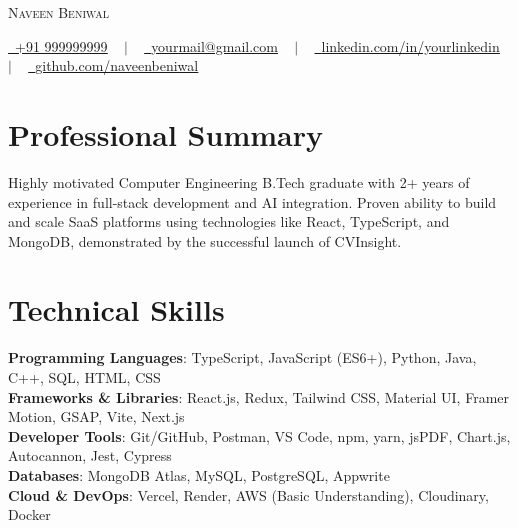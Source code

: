 \documentclass[letterpaper,11pt]{article}
\begin{document}
\begin{center}
    {\Huge \scshape Naveen Beniwal} \\ \vspace{8pt}
    
    \small 
    \href{tel:+919999999999}{\raisebox{-0.1\height}\faPhone\ \underline{+91 999999999}} ~ $|$ ~
    \href{mailto:youremail@gmail.com}{\raisebox{-0.2\height}\faEnvelope\ \underline{yourmail@gmail.com}} ~ $|$ ~
    \href{https://linkedin.com/in/naveenbeniwal}{\raisebox{-0.2\height}\faLinkedin\ \underline{linkedin.com/in/yourlinkedin}} ~ $|$ ~
    \href{https://github.com/naveenbeniwal}{\raisebox{-0.2\height}\faGithub\ \underline{github.com/naveenbeniwal}}
    
    \vspace{-8pt}
\end{center}
\section{Professional Summary}
\begin{justify}
\small{Highly motivated Computer Engineering B.Tech graduate with 2+ years of experience in full-stack development and AI integration. Proven ability to build and scale SaaS platforms using technologies like React, TypeScript, and MongoDB, demonstrated by the successful launch of CVInsight.}
\end{justify}
\vspace{-10pt}

\section{Technical Skills}
\begin{itemize}[leftmargin=0.15in, label={}]
    \small{\item{
        \textbf{Programming Languages}{: TypeScript, JavaScript (ES6+), Python, Java, C++, SQL, HTML, CSS} \\
        \textbf{Frameworks \& Libraries}{: React.js, Redux, Tailwind CSS, Material UI, Framer Motion, GSAP, Vite, Next.js} \\
        \textbf{Developer Tools}{: Git/GitHub, Postman, VS Code, npm, yarn, jsPDF, Chart.js, Autocannon, Jest, Cypress} \\
        \textbf{Databases}{: MongoDB Atlas, MySQL, PostgreSQL, Appwrite} \\
        \textbf{Cloud \& DevOps}{: Vercel, Render, AWS (Basic Understanding), Cloudinary, Docker}
    }}
\end{itemize}
\vspace{-16pt}
\end{document}
